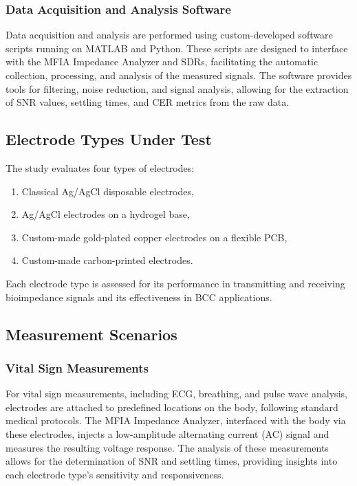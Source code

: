 \documentclass[conference]{IEEEtran}
\begin{document}
\subsubsection{Data Acquisition and Analysis Software}
Data acquisition and analysis are performed using custom-developed software scripts running on MATLAB and Python. These scripts are designed to interface with the MFIA Impedance Analyzer and SDRs, facilitating the automatic collection, processing, and analysis of the measured signals. The software provides tools for filtering, noise reduction, and signal analysis, allowing for the extraction of SNR values, settling times, and CER metrics from the raw data.

\subsection{Electrode Types Under Test}

The study evaluates four types of electrodes:
\begin{enumerate}
    \item Classical Ag/AgCl disposable electrodes,
    \item Ag/AgCl electrodes on a hydrogel base,
    \item Custom-made gold-plated copper electrodes on a flexible PCB,
    \item Custom-made carbon-printed electrodes.
\end{enumerate}
Each electrode type is assessed for its performance in transmitting and receiving bioimpedance signals and its effectiveness in BCC applications.

\subsection{Measurement Scenarios}

\subsubsection{Vital Sign Measurements}
For vital sign measurements, including ECG, breathing, and pulse wave analysis, electrodes are attached to predefined locations on the body, following standard medical protocols. The MFIA Impedance Analyzer, interfaced with the body via these electrodes, injects a low-amplitude alternating current (AC) signal and measures the resulting voltage response. The analysis of these measurements allows for the determination of SNR and settling times, providing insights into each electrode type's sensitivity and responsiveness.
\end{document}
